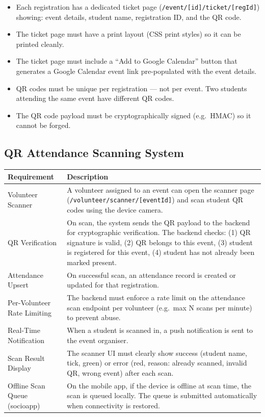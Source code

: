 \documentclass[12pt,a4paper]{article}
\begin{document}
\begin{itemize}[leftmargin=*]
    \item Each registration has a dedicated ticket page (\texttt{/event/[id]/ticket/[regId]}) showing: event details, student name, registration ID, and the QR code.
    \item The ticket page must have a print layout (CSS print styles) so it can be printed cleanly.
    \item The ticket page must include a ``Add to Google Calendar'' button that generates a Google Calendar event link pre-populated with the event details.
    \item QR codes must be unique per registration — not per event. Two students attending the same event have different QR codes.
    \item The QR code payload must be cryptographically signed (e.g.\ HMAC) so it cannot be forged.
\end{itemize}

\subsection{QR Attendance Scanning System}

\begin{tabularx}{\textwidth}{L{4cm} X}
\toprule
{}
\textbf{Requirement} & \textbf{Description} \\
\midrule
Volunteer Scanner & A volunteer assigned to an event can open the scanner page (\texttt{/volunteer/scanner/[eventId]}) and scan student QR codes using the device camera. \\
QR Verification & On scan, the system sends the QR payload to the backend for cryptographic verification. The backend checks: (1) QR signature is valid, (2) QR belongs to this event, (3) student is registered for this event, (4) student has not already been marked present. \\
Attendance Upsert & On successful scan, an attendance record is created or updated for that registration. \\
Per-Volunteer Rate Limiting & The backend must enforce a rate limit on the attendance scan endpoint per volunteer (e.g.\ max N scans per minute) to prevent abuse. \\
Real-Time Notification & When a student is scanned in, a push notification is sent to the event organiser. \\
Scan Result Display & The scanner UI must clearly show success (student name, tick, green) or error (red, reason: already scanned, invalid QR, wrong event) after each scan. \\
Offline Scan Queue (socioapp) & On the mobile app, if the device is offline at scan time, the scan is queued locally. The queue is submitted automatically when connectivity is restored. \\
\bottomrule
\end{tabularx}
\end{document}
